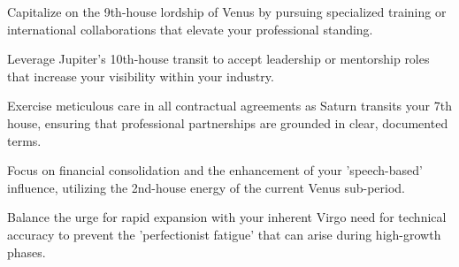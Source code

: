 \begin{diamondlist}
  \item {\fontsize{8.5}{12}\selectfont Capitalize on the 9th-house lordship of Venus by pursuing specialized training or international collaborations that elevate your professional standing.}
  \item {\fontsize{8.5}{12}\selectfont Leverage Jupiter's 10th-house transit to accept leadership or mentorship roles that increase your visibility within your industry.}
  \item {\fontsize{8.5}{12}\selectfont Exercise meticulous care in all contractual agreements as Saturn transits your 7th house, ensuring that professional partnerships are grounded in clear, documented terms.}
  \item {\fontsize{8.5}{12}\selectfont Focus on financial consolidation and the enhancement of your 'speech-based' influence, utilizing the 2nd-house energy of the current Venus sub-period.}
  \item {\fontsize{8.5}{12}\selectfont Balance the urge for rapid expansion with your inherent Virgo need for technical accuracy to prevent the 'perfectionist fatigue' that can arise during high-growth phases.}
\end{diamondlist}


